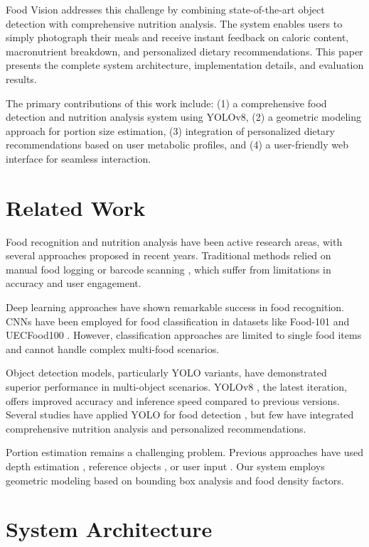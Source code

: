 \documentclass[conference]{IEEEtran}
\begin{document}
Food Vision addresses this challenge by combining state-of-the-art object detection with comprehensive nutrition analysis. The system enables users to simply photograph their meals and receive instant feedback on caloric content, macronutrient breakdown, and personalized dietary recommendations. This paper presents the complete system architecture, implementation details, and evaluation results.

The primary contributions of this work include: (1) a comprehensive food detection and nutrition analysis system using YOLOv8, (2) a geometric modeling approach for portion size estimation, (3) integration of personalized dietary recommendations based on user metabolic profiles, and (4) a user-friendly web interface for seamless interaction.

\section{Related Work}

Food recognition and nutrition analysis have been active research areas, with several approaches proposed in recent years. Traditional methods relied on manual food logging or barcode scanning \cite{barcode_ref}, which suffer from limitations in accuracy and user engagement.

Deep learning approaches have shown remarkable success in food recognition. CNNs have been employed for food classification in datasets like Food-101 \cite{food101} and UECFood100 \cite{uecfood100}. However, classification approaches are limited to single food items and cannot handle complex multi-food scenarios.

Object detection models, particularly YOLO variants, have demonstrated superior performance in multi-object scenarios. YOLOv8 \cite{yolov8}, the latest iteration, offers improved accuracy and inference speed compared to previous versions. Several studies have applied YOLO for food detection \cite{yolo_food1, yolo_food2}, but few have integrated comprehensive nutrition analysis and personalized recommendations.

Portion estimation remains a challenging problem. Previous approaches have used depth estimation \cite{depth_est}, reference objects \cite{reference_obj}, or user input \cite{user_input}. Our system employs geometric modeling based on bounding box analysis and food density factors.

\section{System Architecture}
\end{document}
